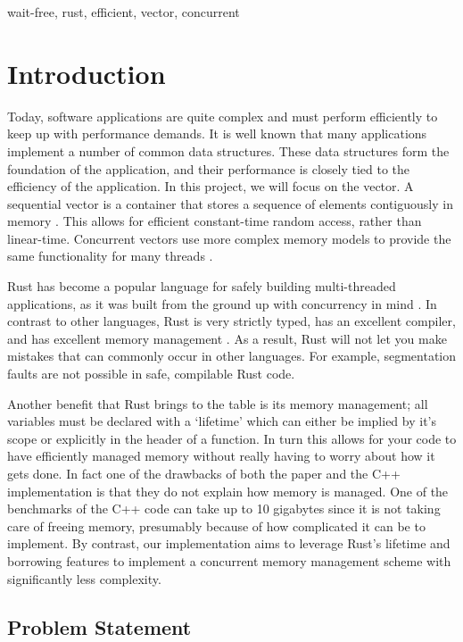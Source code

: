 \documentclass[conference]{IEEEtran}
\begin{document}
\begin{IEEEkeywords}
wait-free, rust, efficient, vector, concurrent
\end{IEEEkeywords}

\section{Introduction}

Today, software applications are quite complex and must perform efficiently to keep up with performance demands. It is well known that many applications implement a number of common data structures. These data structures form the foundation of the application, and their performance is closely tied to the efficiency of the application. In this project, we will focus on the vector. A sequential vector is a container that stores a sequence of elements contiguously in memory \cite{main}. This allows for efficient constant-time random access, rather than linear-time. Concurrent vectors use more complex memory models to provide the same functionality for many threads \cite{main}.

Rust has become a popular language for safely building multi-threaded applications, as it was built from the ground up with concurrency in mind \cite{rust}. In contrast to other languages, Rust is very strictly typed, has an excellent compiler, and has excellent memory management \cite{rust}. As a result, Rust will not let you make mistakes that can commonly occur in other languages. For example, segmentation faults are not possible in safe, compilable Rust code.

Another benefit that Rust brings to the table is its memory management; all variables must be declared with a ‘lifetime’ which can either be implied by it’s scope or explicitly in the header of a function. In turn this allows for your code to have efficiently managed memory without really having to worry about how it gets done. In fact one of the drawbacks of both the paper and the C++ implementation is that they do not explain how memory is managed. One of the benchmarks of the C++ code can take up to 10 gigabytes since it is not taking care of freeing memory, presumably because of how complicated it can be to implement. By contrast, our implementation aims to leverage Rust's lifetime and borrowing features to implement a concurrent memory management scheme with significantly less complexity.



\subsection{Problem Statement}
\end{document}

